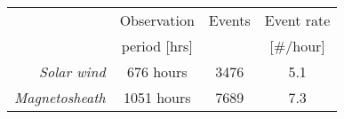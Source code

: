 \begin{tabular}{rccc}
\hline
                        & Observation        & Events & Event rate \\
                        & period [hrs]       &        & [\#/hour]  \\
\hline
\textit{Solar wind}     & 676 hours          &  3476  & 5.1 \\
\textit{Magnetosheath}  & 1051 hours         &  7689  & 7.3 \\
\hline
\end{tabular}